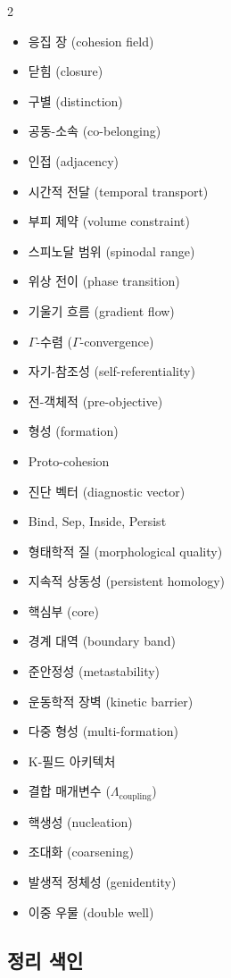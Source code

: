 \begin{multicols}{2}
\begin{itemize}
\item 응집 장 (cohesion field)
\item 닫힘 (closure)
\item 구별 (distinction)
\item 공동-소속 (co-belonging)
\item 인접 (adjacency)
\item 시간적 전달 (temporal transport)
\item 부피 제약 (volume constraint)
\item 스피노달 범위 (spinodal range)
\item 위상 전이 (phase transition)
\item 기울기 흐름 (gradient flow)
\item $\Gamma$-수렴 ($\Gamma$-convergence)
\item 자기-참조성 (self-referentiality)
\item 전-객체적 (pre-objective)
\item 형성 (formation)
\item Proto-cohesion
\item 진단 벡터 (diagnostic vector)
\item Bind, Sep, Inside, Persist
\item 형태학적 질 (morphological quality)
\item 지속적 상동성 (persistent homology)
\item 핵심부 (core)
\item 경계 대역 (boundary band)
\item 준안정성 (metastability)
\item 운동학적 장벽 (kinetic barrier)
\item 다중 형성 (multi-formation)
\item K-필드 아키텍처
\item 결합 매개변수 ($\Lambda_{\mathrm{coupling}}$)
\item 핵생성 (nucleation)
\item 조대화 (coarsening)
\item 발생적 정체성 (genidentity)
\item 이중 우물 (double well)
\end{itemize}
\end{multicols}


\subsection{정리 색인}

